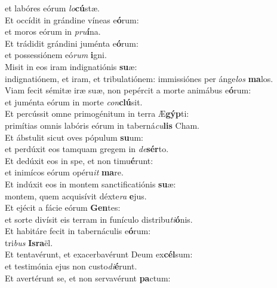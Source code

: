 \oddverse et labóres eórum \textit{lo}\textbf{cú}stæ.\\
\evenverse Et occídit in grándine víneas e\textbf{ó}rum:~\*\\
\evenverse et moros eórum in \textit{pru}\textbf{í}na.\\
\oddverse Et trádidit grándini juménta e\textbf{ó}rum:~\*\\
\oddverse et possessiónem eó\textit{rum} \textbf{i}gni.\\
\evenverse Misit in eos iram indignatiónis \textbf{su}æ:~\*\\
\evenverse indignatiónem, et iram, et tribulatiónem: immissiónes per ánge\textit{los} \textbf{ma}los.\\
\oddverse Viam fecit sémitæ iræ suæ, non pepércit a morte animábus e\textbf{ó}rum:~\*\\
\oddverse et juménta eórum in morte \textit{con}\textbf{clú}sit.\\
\evenverse Et percússit omne primogénitum in terra Æ\textbf{gýp}ti:~\*\\
\evenverse primítias omnis labóris eórum in taberná\textit{cu}\textbf{lis} Cham.\\
\oddverse Et ábstulit sicut oves pópulum \textbf{su}um:~\*\\
\oddverse et perdúxit eos tamquam gregem in \textit{de}\textbf{sér}to.\\
\evenverse Et dedúxit eos in spe, et non timu\textbf{é}runt:~\*\\
\evenverse et inimícos eórum opéru\textit{it} \textbf{ma}re.\\
\oddverse Et indúxit eos in montem sanctificatiónis \textbf{su}æ:~\*\\
\oddverse montem, quem acquisívit déxte\textit{ra} \textbf{e}jus.\\
\evenverse Et ejécit a fácie eórum \textbf{Gen}tes:~\*\\
\evenverse et sorte divísit eis terram in funículo distribu\textit{ti}\textbf{ó}nis.\\
\oddverse Et habitáre fecit in tabernáculis e\textbf{ó}rum:~\*\\
\oddverse tri\textit{bus} \textbf{Is}\textbf{ra}ël.\\
\evenverse Et tentavérunt, et exacerbavérunt Deum ex\textbf{cél}sum:~\*\\
\evenverse et testimónia ejus non custo\textit{di}\textbf{é}runt.\\
\oddverse Et avertérunt se, et non servavérunt \textbf{pa}ctum:~\*\\
